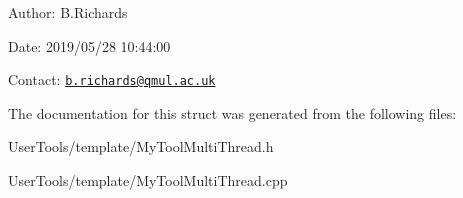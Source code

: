 \begin{DoxyParagraph}{Author\-:}
B.\-Richards 
\end{DoxyParagraph}
\begin{DoxyParagraph}{Date\-:}
2019/05/28 10\-:44\-:00 
\end{DoxyParagraph}
Contact\-: \href{mailto:b.richards@qmul.ac.uk}{\tt b.\-richards@qmul.\-ac.\-uk} 

The documentation for this struct was generated from the following files\-:\begin{DoxyCompactItemize}
\item 
User\-Tools/template/My\-Tool\-Multi\-Thread.\-h\item 
User\-Tools/template/My\-Tool\-Multi\-Thread.\-cpp\end{DoxyCompactItemize}
